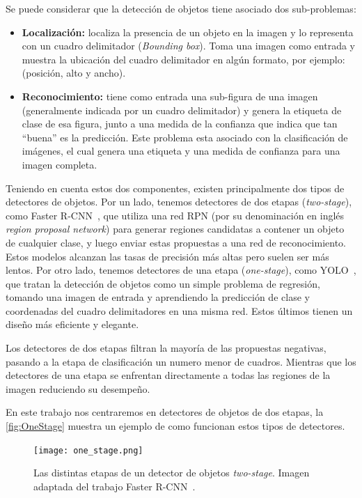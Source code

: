 Se puede considerar que la detección de objetos tiene asociado dos sub-problemas:

\begin{itemize}
	\item \textbf{Localización:} localiza la presencia de un objeto en la imagen y lo representa con un cuadro delimitador (\textit{Bounding box}). Toma una imagen como entrada y muestra la ubicación del cuadro delimitador en algún formato, por ejemplo: (posición, alto y ancho).
	\item \textbf{Reconocimiento:} tiene como entrada una sub-figura de una imagen (generalmente indicada por un cuadro delimitador) y genera la etiqueta de clase de esa figura, junto a una medida de la confianza que indica que tan ``buena'' es la predicción. Este problema esta asociado con la clasificación de imágenes, el cual genera una etiqueta y una medida de confianza para una imagen completa.
\end{itemize}


Teniendo en cuenta estos dos componentes, existen principalmente dos tipos de detectores de objetos. Por un lado, tenemos detectores de dos etapas (\textit{two-stage}), como Faster R-CNN~\cite{ren2015faster}, que utiliza una red  RPN (por su denominación en inglés \textit{region proposal network}) para generar regiones candidatas a contener un objeto de cualquier clase, y luego enviar estas propuestas a una red de reconocimiento. Estos modelos alcanzan las tasas de precisión más altas pero suelen ser más lentos. Por otro lado, tenemos detectores de una etapa (\textit{one-stage}), como YOLO~\cite{redmon2016you}, que tratan la detección de objetos como un simple problema de regresión, tomando una imagen de entrada y aprendiendo la predicción de clase y coordenadas del cuadro delimitadores en una misma red. Estos últimos tienen un diseño más eficiente y elegante. 

Los detectores de dos etapas filtran la mayoría de las propuestas negativas, pasando a la etapa de clasificación un numero menor de cuadros. Mientras que los detectores de una etapa se enfrentan directamente a todas las regiones de la imagen reduciendo su desempeño.

En este trabajo nos centraremos en detectores de objetos de dos etapas, la \autoref{fig:OneStage} muestra un ejemplo de como funcionan estos tipos de detectores.\\

\begin{figure}
	\centering
	\texttt{[image: one\_stage.png]}
	\caption{Las distintas etapas de un detector de objetos \textit{two-stage}. Imagen adaptada del trabajo Faster R-CNN~\cite{ren2015faster}.}
	\label{fig:OneStage}
\end{figure}

